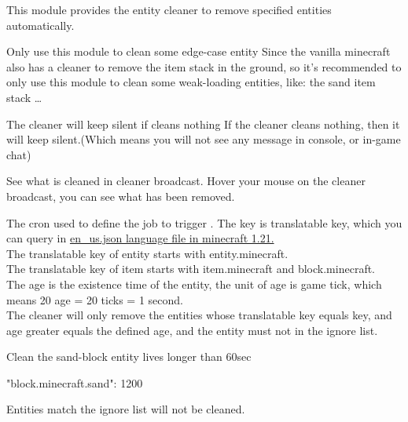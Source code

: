 
This module provides the entity cleaner to remove specified entities automatically.

\begin{note}{Only use this module to clean some edge-case entity}
    Since the vanilla minecraft also has a cleaner to remove the item stack in the ground, so it's recommended to only use this module to clean some weak-loading entities, like: the sand item stack \ldots
\end{note}


\begin{note}{The cleaner will keep silent if cleans nothing}
    If the cleaner cleans nothing, then it will keep silent.(Which means you will not see any message in console, or in-game chat)
\end{note}

\begin{tips}{See what is cleaned in cleaner broadcast.}
    Hover your mouse on the cleaner broadcast, you can see what has been removed.
\end{tips}

The cron used to define the job to trigger .
The key is translatable key, which you can query in \href{https://github.com/sakurawald/fuji-fabric/blob/dev/.github/files/en_us.json}{en\_us.json language file in minecraft 1.21.} \\
The translatable key of entity starts with entity.minecraft. \\
The translatable key of item starts with item.minecraft and block.minecraft. \\
The age is the existence time of the entity, the unit of age is game tick, which means 20 age = 20 ticks = 1 second. \\
The cleaner will only remove the entities whose translatable key equals key, and age greater equals the defined age, and the entity must not in the ignore list.

\begin{example}{Clean the sand-block entity lives longer than 60sec}
    \begin{json}
        "block.minecraft.sand": 1200
    \end{json}
\end{example}

Entities match the ignore list will not be cleaned.

